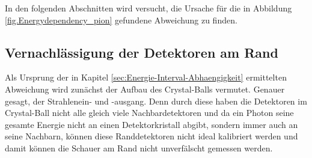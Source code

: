 \documentclass[a4paper,11pt,oneside,final,german,openbib,pdftex]{scrbook}
\begin{document}
{%

In den folgenden Abschnitten wird versucht, die Ursache für die in Abbildung \ref{fig.Energydependency_pion} gefundene Abweichung zu finden.


\subsection{Vernachl\"assigung der Detektoren am Rand}
\label{sec:Vernachlaessigung-der-Detektoren-am-Rand}

Als Ursprung der in Kapitel \ref{sec:Energie-Interval-Abhaengigkeit} ermittelten Abweichung wird zun\"achst der Aufbau des Crystal-Balls vermutet. Genauer gesagt, der Strahlenein- und -ausgang. Denn durch diese haben die Detektoren im Crystal-Ball nicht alle gleich viele Nachbardetektoren und da ein Photon seine gesamte Energie nicht an einen Detektorkristall abgibt, sondern immer auch an seine Nachbarn, k\"onnen diese Randdetektoren nicht ideal kalibriert werden und damit k\"onnen die Schauer am Rand nicht unverf\"alscht gemessen werden. 



}
\end{document}
